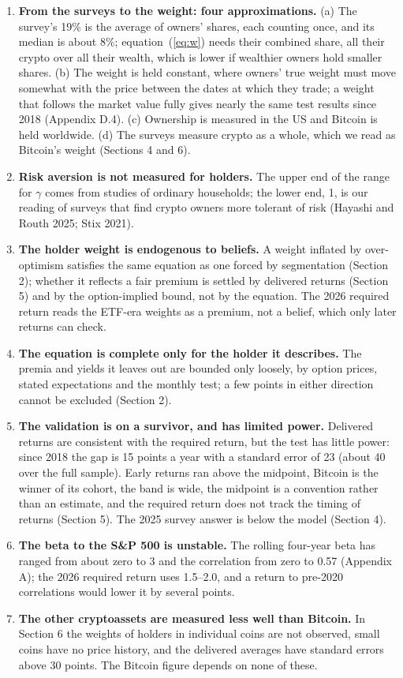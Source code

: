 \documentclass[11pt]{article}
\begin{document}
\begin{enumerate}
\item \textbf{From the surveys to the weight: four approximations.} (a) The survey's 19\% is the average of owners' shares, each counting once, and its median is about 8\%; equation~(\ref{eq:w}) needs their combined share, all their crypto over all their wealth, which is lower if wealthier owners hold smaller shares. (b) The weight is held constant, where owners' true weight must move somewhat with the price between the dates at which they trade; a weight that follows the market value fully gives nearly the same test results since 2018 (Appendix D.4). (c) Ownership is measured in the US and Bitcoin is held worldwide. (d) The surveys measure crypto as a whole, which we read as Bitcoin's weight (Sections 4 and 6).
\item \textbf{Risk aversion is not measured for holders.} The upper end of the range for $\gamma$ comes from studies of ordinary households; the lower end, 1, is our reading of surveys that find crypto owners more tolerant of risk (Hayashi and Routh 2025; Stix 2021).
\item \textbf{The holder weight is endogenous to beliefs.} A weight inflated by over-optimism satisfies the same equation as one forced by segmentation (Section 2); whether it reflects a fair premium is settled by delivered returns (Section 5) and by the option-implied bound, not by the equation. The 2026 required return reads the ETF-era weights as a premium, not a belief, which only later returns can check.
\item \textbf{The equation is complete only for the holder it describes.} The premia and yields it leaves out are bounded only loosely, by option prices, stated expectations and the monthly test; a few points in either direction cannot be excluded (Section 2).
\item \textbf{The validation is on a survivor, and has limited power.} Delivered returns are consistent with the required return, but the test has little power: since 2018 the gap is 15 points a year with a standard error of 23 (about 40 over the full sample). Early returns ran above the midpoint, Bitcoin is the winner of its cohort, the band is wide, the midpoint is a convention rather than an estimate, and the required return does not track the timing of returns (Section 5). The 2025 survey answer is below the model (Section 4).
\item \textbf{The beta to the S\&P 500 is unstable.} The rolling four-year beta has ranged from about zero to 3 and the correlation from zero to 0.57 (Appendix A); the 2026 required return uses 1.5--2.0, and a return to pre-2020 correlations would lower it by several points.
\item \textbf{The other cryptoassets are measured less well than Bitcoin.} In Section 6 the weights of holders in individual coins are not observed, small coins have no price history, and the delivered averages have standard errors above 30 points. The Bitcoin figure depends on none of these.
\end{enumerate}
\end{document}
